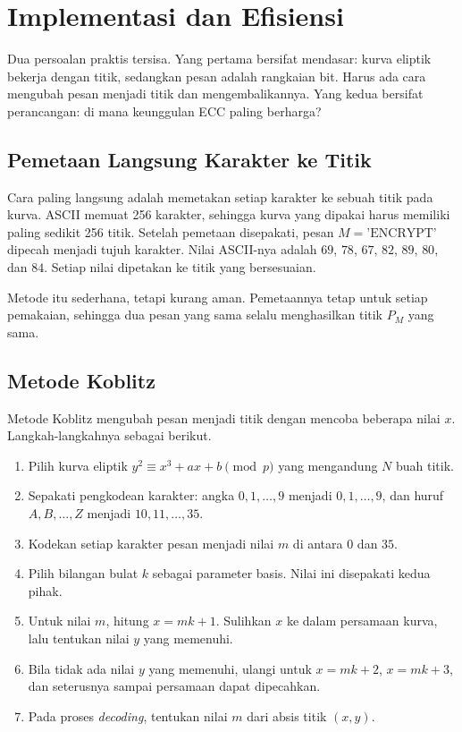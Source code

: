 \section{Implementasi dan Efisiensi}
\label{sec:implementasi-ecc}

Dua persoalan praktis tersisa. Yang pertama bersifat mendasar: kurva eliptik
bekerja dengan titik, sedangkan pesan adalah rangkaian bit. Harus ada cara
mengubah pesan menjadi titik dan mengembalikannya. Yang kedua bersifat
perancangan: di mana keunggulan ECC paling berharga?

\subsection{Pemetaan Langsung Karakter ke Titik}
\label{subsec:pemetaan-langsung}

Cara paling langsung adalah memetakan setiap karakter ke sebuah titik pada
kurva. ASCII memuat 256 karakter, sehingga kurva yang dipakai harus memiliki
paling sedikit 256 titik. Setelah pemetaan disepakati, pesan
$M = \text{'ENCRYPT'}$ dipecah menjadi tujuh karakter. Nilai ASCII-nya adalah
$69$, $78$, $67$, $82$, $89$, $80$, dan $84$. Setiap nilai dipetakan ke titik
yang bersesuaian.

Metode itu sederhana, tetapi kurang aman. Pemetaannya tetap untuk setiap
pemakaian, sehingga dua pesan yang sama selalu menghasilkan titik $P_M$ yang
sama.

\subsection{Metode Koblitz}
\label{subsec:koblitz}

Metode Koblitz mengubah pesan menjadi titik dengan mencoba beberapa nilai $x$.
Langkah-langkahnya sebagai berikut.
\begin{enumerate}
    \item Pilih kurva eliptik $y^2 \equiv x^3 + ax + b \pmod{p}$ yang mengandung
          $N$ buah titik.
    \item Sepakati pengkodean karakter: angka $0, 1, \dots, 9$ menjadi
          $0, 1, \dots, 9$, dan huruf $A, B, \dots, Z$ menjadi $10, 11, \dots,
          35$.
    \item Kodekan setiap karakter pesan menjadi nilai $m$ di antara $0$ dan
          $35$.
    \item Pilih bilangan bulat $k$ sebagai parameter basis. Nilai ini disepakati
          kedua pihak.
    \item Untuk nilai $m$, hitung $x = mk + 1$. Sulihkan $x$ ke dalam persamaan
          kurva, lalu tentukan nilai $y$ yang memenuhi.
    \item Bila tidak ada nilai $y$ yang memenuhi, ulangi untuk $x = mk + 2$,
          $x = mk + 3$, dan seterusnya sampai persamaan dapat dipecahkan.
    \item Pada proses \emph{decoding}, tentukan nilai $m$ dari absis titik
          $(x, y)$.
\end{enumerate}

